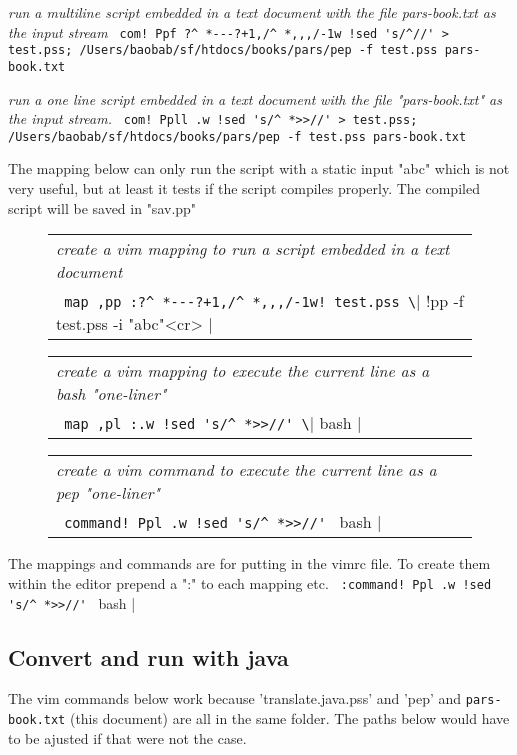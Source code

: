 \documentclass[a4paper,12pt]{article}
\begin{document}
 \emph{ run a multiline script embedded in a text document }
 \emph{ with the file pars-book.txt as the input stream } 
 \verb| com! Ppf ?^ *---?+1,/^ *,,,/-1w !sed 's/^//' > test.pss; /Users/baobab/sf/htdocs/books/pars/pep -f test.pss pars-book.txt |

 \emph{ run a one line script embedded in a text document }
 \emph{ with the file "pars-book.txt" as the input stream.  } 
 \verb| com! Ppll .w !sed 's/^ *>>//' > test.pss; /Users/baobab/sf/htdocs/books/pars/pep -f test.pss pars-book.txt  |


  The mapping below can only run the script with a static input "abc"
  which is not very useful, but at least it tests if the script compiles
  properly. The compiled script will be saved in "sav.pp"
 \begin{figure}
 \begin{tabular}{ l }
 \emph{ create a vim mapping to run a script embedded in a text document } \\ 
 \verb| map ,pp :?^ *---?+1,/^ *,,,/-1w! test.pss \| !pp -f test.pss -i "abc"<cr> |
 \end{tabular} 
 \end{figure}
 \begin{figure}
 \begin{tabular}{ l }
 \emph{ create a vim mapping to execute the current line as a bash "one-liner" } \\ 
 \verb| map ,pl :.w !sed 's/^ *>>//' \| bash |
 \end{tabular} 
 \end{figure}
 \begin{figure}
 \begin{tabular}{ l }
 \emph{ create a vim command to execute the current line as a pep "one-liner" } \\ 
 \verb| command! Ppl .w !sed 's/^ *>>//' | bash |
 \end{tabular} 
 \end{figure}

  The mappings and commands are for putting in the vimrc file. To
  create them within the editor prepend a ":" to each mapping etc. 
 \verb| :command! Ppl .w !sed 's/^ *>>//' | bash |


\subsection{Convert and run with java}

  The vim commands below work because 'translate.java.pss' and 'pep' and
  \texttt{pars-book.txt} (this document) are all in the same folder. The paths
  below would have to be ajusted if that were not the case.
\end{document}
